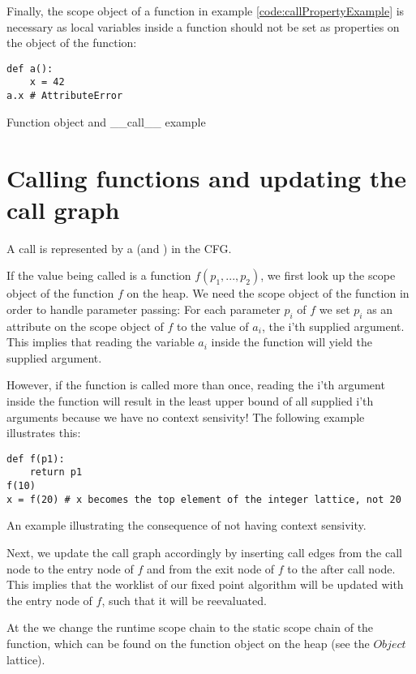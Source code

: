 Finally, the scope object of a function in example \ref{code:callPropertyExample} is necessary as local variables inside a function should not be set as properties on the object of the function:

\begin{listing}[H]
	\begin{verbatim}
def a(): 
	x = 42
a.x # AttributeError
	\end{verbatim}
\caption{Function object and \_\_call\_\_ example}\label{code:callPropertyExample}
\end{listing}


\section{Calling functions and updating the call graph}
A call is represented by a  (and ) in the CFG.

If the value being called is a function $f(p_1, ..., p_2)$, we first look up the scope object of the function $f$ on the heap. We need the scope object of the function in order to handle parameter passing: For each parameter $p_i$ of $f$ we set $p_i$ as an attribute on the scope object of $f$ to the value of $a_i$, the i'th supplied argument. This implies that reading the variable $a_i$ inside the function will yield the supplied argument.

However, if the function is called more than once, reading the i'th argument inside the function will result in the least upper bound of all supplied i'th arguments because we have no context sensivity! The following example illustrates this:

\begin{listing}[H]
	\begin{verbatim}
def f(p1): 
	return p1
f(10)
x = f(20) # x becomes the top element of the integer lattice, not 20
	\end{verbatim}
\caption{An example illustrating the consequence of not having context sensivity.}
\end{listing}

Next, we update the call graph accordingly by inserting call edges from the call node to the entry node of $f$ and from the exit node of $f$ to the after call node. This implies that the worklist of our fixed point algorithm will be updated with the entry node of $f$, such that it will be reevaluated.

At the  we change the runtime scope chain to the static scope chain of the function, which can be found on the function object on the heap (see the $Object$ lattice).

